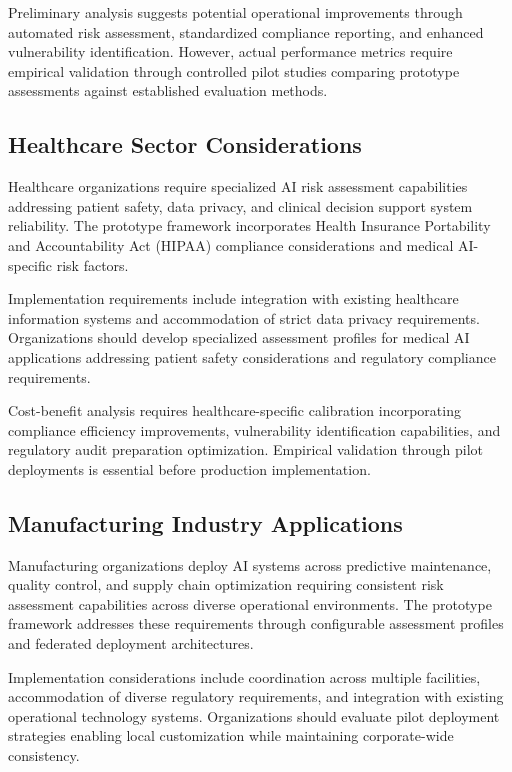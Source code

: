 \documentclass[11pt,letterpaper]{article}
\begin{document}
Preliminary analysis suggests potential operational improvements through automated risk assessment, standardized compliance reporting, and enhanced vulnerability identification. However, actual performance metrics require empirical validation through controlled pilot studies comparing prototype assessments against established evaluation methods.

\subsection{Healthcare Sector Considerations}

Healthcare organizations require specialized AI risk assessment capabilities addressing patient safety, data privacy, and clinical decision support system reliability. The prototype framework incorporates Health Insurance Portability and Accountability Act (HIPAA) compliance considerations and medical AI-specific risk factors.

Implementation requirements include integration with existing healthcare information systems and accommodation of strict data privacy requirements. Organizations should develop specialized assessment profiles for medical AI applications addressing patient safety considerations and regulatory compliance requirements.

Cost-benefit analysis requires healthcare-specific calibration incorporating compliance efficiency improvements, vulnerability identification capabilities, and regulatory audit preparation optimization. Empirical validation through pilot deployments is essential before production implementation.

\subsection{Manufacturing Industry Applications}

Manufacturing organizations deploy AI systems across predictive maintenance, quality control, and supply chain optimization requiring consistent risk assessment capabilities across diverse operational environments. The prototype framework addresses these requirements through configurable assessment profiles and federated deployment architectures.

Implementation considerations include coordination across multiple facilities, accommodation of diverse regulatory requirements, and integration with existing operational technology systems. Organizations should evaluate pilot deployment strategies enabling local customization while maintaining corporate-wide consistency.
\end{document}
